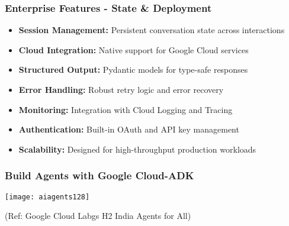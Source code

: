 \begin{frame}[fragile]\frametitle{Enterprise Features - State \& Deployment}
      \begin{itemize}
	\item \textbf{Session Management:} Persistent conversation state across interactions
	\item \textbf{Cloud Integration:} Native support for Google Cloud services
	\item \textbf{Structured Output:} Pydantic models for type-safe responses
	\item \textbf{Error Handling:} Robust retry logic and error recovery
	\item \textbf{Monitoring:} Integration with Cloud Logging and Tracing
	\item \textbf{Authentication:} Built-in OAuth and API key management
	\item \textbf{Scalability:} Designed for high-throughput production workloads
	  \end{itemize}
\end{frame}

\begin{frame}[fragile]\frametitle{Build Agents with Google Cloud-ADK}
	
		\begin{center}
		\texttt{[image: aiagents128]}
		
		{\tiny (Ref: Google Cloud Labgs H2 India Agents for All)}
		\end{center}	
\end{frame}

